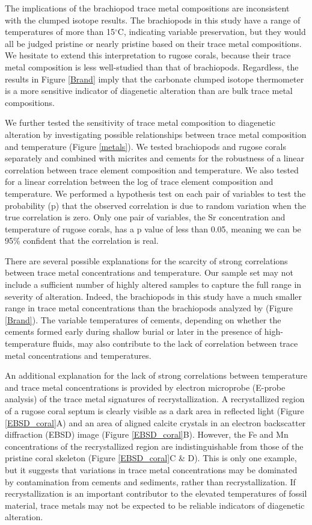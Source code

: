 \documentclass{article}
\newcommand{\degrees}{$^{\circ}$}
\begin{document}
The implications of the brachiopod trace metal compositions are inconsistent with the clumped isotope results. The brachiopods in this study have a range of temperatures of more than 15\degrees C, indicating variable preservation, but they would all be judged pristine or nearly pristine based on their trace metal compositions. We hesitate to extend this interpretation to rugose corals, because their trace metal composition is less well-studied than that of brachiopods. Regardless, the results in Figure \ref{Brand} imply that the carbonate clumped isotope thermometer is a more sensitive indicator of diagenetic alteration than are bulk trace metal compositions.

We further tested the sensitivity of trace metal composition to diagenetic alteration by investigating possible relationships between trace metal composition and temperature (Figure \ref{metals}). We tested brachiopods and rugose corals separately and combined with micrites and cements for the robustness of a linear correlation between trace element composition and temperature. We also tested for a linear correlation between the log of trace element composition and temperature. We performed a hypothesis test on each pair of variables to test the probability (p) that the observed correlation is due to random variation when the true correlation is zero. Only one pair of variables, the Sr concentration and temperature of rugose corals, has a p value of less than 0.05, meaning we can be 95\% confident that the correlation is real. 

There are several possible explanations for the scarcity of strong correlations between trace metal concentrations and temperature. Our sample set may not include a sufficient number of highly altered samples to capture the full range in severity of alteration. Indeed, the brachiopods in this study have a much smaller range in trace metal concentrations than the brachiopods analyzed by \cite{Brand2012} (Figure \ref{Brand}). The variable temperatures of cements, depending on whether the cements formed early during shallow burial or later in the presence of high-temperature fluids, may also contribute to the lack of correlation between trace metal concentrations and temperatures. 

An additional explanation for the lack of strong correlations between temperature and trace metal concentrations is provided by electron microprobe (E-probe analysis) of the trace metal signatures of recrystallization. A recrystallized region of a rugose coral septum is clearly visible as a dark area in reflected light (Figure \ref{EBSD_coral}A) and an area of aligned calcite crystals in an electron backscatter diffraction (EBSD) image (Figure \ref{EBSD_coral}B). However, the Fe and Mn concentrations of the recrystallized region are indistinguishable from those of the pristine coral skeleton (Figure \ref{EBSD_coral}C \& D). This is only one example, but it suggests that variations in trace metal concentrations may be dominated by contamination from cements and sediments, rather than recrystallization. If recrystallization is an important contributor to the elevated temperatures of fossil material, trace metals may not be expected to be reliable indicators of diagenetic alteration.
\end{document}
